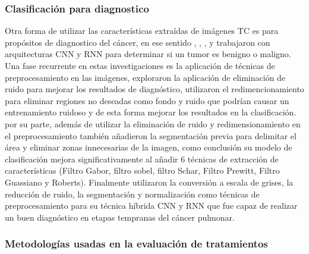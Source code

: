 \documentclass[11pt,a4paper,openany]{article}
\begin{document}
        \subsubsection{Clasificación para diagnostico}
        Otra forma de utilizar las características extraídas de imágenes TC es para propósitos de diagnostico del cáncer, en ese sentido \cite{Gopinath2023}, \cite{Raza2023}, \cite{Rajasekar2023}, \cite{Maleki2023} y \cite{Wankhade2023} trabajaron con arquitecturas CNN y RNN para determinar si un tumor es benigno o maligno. Una fase recurrente en estas investigaciones es la aplicación de técnicas de preprocesamiento en las imágenes, \cite{Gopinath2023} exploraron la aplicación de eliminación de ruido para mejorar los resultados de diagnóstico, \cite{Raza2023} utilizaron el redimencionamiento para eliminar regiones no deseadas como fondo y ruido que podrían causar un entrenamiento ruidoso y de esta forma mejorar los resultados en la clasificación. \cite{Maleki2023} por su parte, además de utilizar la eliminación de ruido y redimensionamiento en el preprocesamiento también añadieron la segmentación previa para delimitar el área y eliminar zonas innecesarias de la imagen, como conclusión su modelo de clasificación mejora significativamente al añadir 6 técnicas de extracción de características (Filtro Gabor, filtro sobel, filtro Schar, Filtro Prewitt, Filtro Guassiano y Roberts). Finalmente \cite{Wankhade2023} utilizaron la conversión a escala de grises, la reducción de ruido, la segmentación y normalización como técnicas de preprocesamiento para su técnica híbrida CNN y RNN que fue capaz de realizar un buen diagnóstico en etapas tempranas del cáncer pulmonar.\\
        
        \subsubsection{Metodologías usadas en la evaluación de tratamientos}\label{sec:3.2.2}
\end{document}
